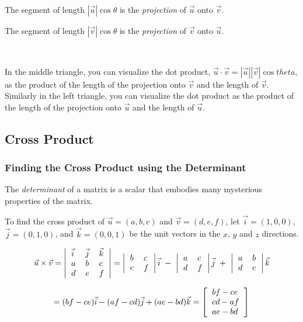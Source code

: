 The segment of length $|\vec{u}| \cos \theta$ is the {\it projection} of $\vec{u}$ onto $\vec{v}$.

The segment of length $|\vec{v}| \cos \theta$ is the {\it projection} of $\vec{v}$ onto $\vec{u}$.

\

In the middle triangle, you can visualize the dot product, $\vec{u} \cdot \vec{v} = |\vec{u}| |\vec{v}| \cos theta$, as the product of the length of the projection onto $\vec{v}$ and the length of $\vec{v}$.  Similarly in the left triangle, you can visualize the dot product as the product of the length of the projection onto $\vec{u}$ and the length of $\vec{u}$.  

\subsection{Cross Product}

\subsubsection{Finding the Cross Product using the Determinant}

The {\it determinant} of a matrix is a scalar that embodies many mysterious properties of the matrix.  

To find the cross product of $\vec{u} = (a,b,c)$ and $\vec{v} = (d,e,f)$, let $\vec{i} = (1,0,0)$, $\vec{j}=(0,1,0)$, and $\vec{k}=(0,0,1)$ be the unit vectors in the $x$, $y$ and $z$ directions.  

$$\vec{u} \times \vec{v} = 
\left|
\begin{tabular}{*3{>{$}l<{$}}}
	\vec{i} & \vec{j} & \vec{k} \cr
	a & b & c \cr
	d & e & f \cr
\end{tabular}
\right|
= 
\left| 
\begin{tabular}{*2{>{$}l<{$}}}
	b & c \cr
	e & f \cr
\end{tabular}
\right|
\vec{i}
\ - \
\left| 
\begin{tabular}{*2{>{$}l<{$}}}
	a & c \cr
	d & f \cr
\end{tabular}
\right|
\vec{j}
\ + \ 
\left| 
\begin{tabular}{*2{>{$}l<{$}}}
	a & b \cr
	d & e\cr
\end{tabular}
\right|
\vec{k}
$$

$$ = (bf-ce)\vec{i} - (af-cd) \vec{j} + (ae-bd)\vec{k} = 
\left[
\begin{tabular}{*3{>{$}l<{$}}}
	bf-ce \cr
	cd-af \cr
	ae-bd
\end{tabular}
\right]
$$

